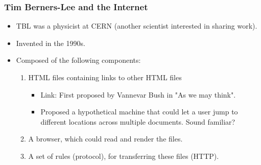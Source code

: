 \documentclass{beamer}
\begin{document}
%
%
\begin{frame}[fragile]
    \frametitle{Tim Berners-Lee and the Internet}
    \begin{itemize}
        \item TBL was a physicist at CERN (another scientist interested in sharing work).
            \pause
        \item Invented in the 1990s.
            \pause
        \item Composed of the following components:
            \begin{enumerate}
                \pause
                \item HTML files containing links to other HTML files
                    \pause
                    \begin{itemize}
                        \item Link: First proposed by Vannevar Bush in "As we may think".
                        \item Proposed a hypothetical machine that could let a user jump to different locations across multiple documents. Sound familiar?
                    \end{itemize}
                    \pause
                \item A browser, which could read and render the files.
                    \pause
                \item A set of rules (protocol), for transferring these files (HTTP).
            \end{enumerate}

    \end{itemize}
\end{frame}
\end{document}
